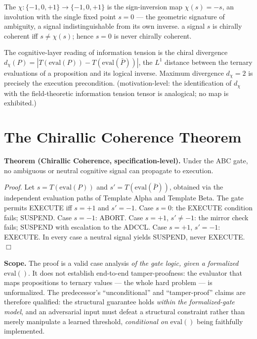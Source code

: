 \documentclass{alienfolio}
\begin{document}
The  $\chi: \{-1,0,+1\} \to \{-1,0,+1\}$ is the
sign-inversion map $\chi(s) = -s$, an involution with the single fixed point
$s = 0$ --- the geometric signature of ambiguity, a signal indistinguishable
from its own inverse.  a signal $s$ is
chirally coherent iff $s \neq \chi(s)$; hence $s = 0$ is never chirally
coherent.

The cognitive-layer reading of information tension is the chiral divergence
$d_\chi(P) = |T(\mathrm{eval}(P)) - T(\mathrm{eval}(\bar{P}))|$, the $L^1$
distance between the ternary evaluations of a proposition and its logical
inverse. Maximum divergence $d_\chi = 2$ is precisely the execution
precondition.  (motivation-level: the identification of
$d_\chi$ with the field-theoretic information tension tensor is analogical;
no map is exhibited.)

\section{The Chirallic Coherence Theorem}
\textbf{Theorem (Chirallic Coherence, specification-level).} Under the ABC
gate, no ambiguous or neutral cognitive signal can propagate to execution.

\emph{Proof.} Let $s = T(\mathrm{eval}(P))$ and
$s' = T(\mathrm{eval}(\bar{P}))$, obtained via the independent evaluation
paths of Template Alpha and Template Beta. The gate permits EXECUTE iff
$s = +1$ and $s' = -1$. Case $s = 0$: the EXECUTE condition fails;
SUSPEND. Case $s = -1$: ABORT. Case $s = +1$, $s' \neq -1$: the mirror check
fails; SUSPEND with escalation to the ADCCL. Case $s = +1$, $s' = -1$:
EXECUTE. In every case a neutral signal yields SUSPEND, never EXECUTE. $\Box$

 \textbf{Scope.} The proof is a valid case analysis
\emph{of the gate logic, given a formalized} $\mathrm{eval}()$. It does not
establish end-to-end tamper-proofness: the evaluator that maps propositions
to ternary values --- the whole hard problem --- is unformalized. The
predecessor's ``unconditional'' and ``tamper-proof'' claims are therefore
qualified: the structural guarantee holds \emph{within the formalized-gate
model}, and an adversarial input must defeat a structural constraint rather
than merely manipulate a learned threshold, \emph{conditional on}
$\mathrm{eval}()$ being faithfully implemented.
\end{document}
